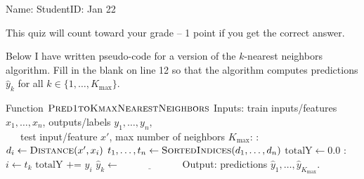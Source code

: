 \documentclass{article}[12pt]
\begin{document}
\thispagestyle{empty}


Name: \underline{\hspace{2in}} StudentID: \underline{\hspace{2in}} Jan 22

This quiz will count toward your grade -- 1 point if you get the
correct answer.

Below I have written pseudo-code for a version of the $k$-nearest
neighbors algorithm. Fill in the blank on line 12 so that the
algorithm computes predictions $\hat y_k$ for all
$k\in\{1,\dots, K_{\text{max}}\}$.

\begin{algorithmic}[1]
  \State Function $\textsc{Pred1toKmaxNearestNeighbors}$
  \State Inputs: train inputs/features $x_1,\dots,x_n$, outputs/labels $y_1,\dots,y_n$,\\ \ \ \ test input/feature $x'$, max number of neighbors $K_{\text{max}}$:
  :
  \State $d_i\gets \textsc{Distance}(x', x_i)$
  \EndFor
  \State $t_1,\dots,t_n\gets \textsc{SortedIndices}(d_1,\dots,d_n)$
  \State $\text{totalY}\gets 0.0$
  :
  \State $i\gets t_k$
  \State $\text{totalY} \texttt{ += } y_i$
  \State $\hat y_k\gets \underline{\hspace{1in}}$
  \EndFor
  \State Output: predictions $\hat y_1, \dots, \hat y_{K_\text{max}}$.
\end{algorithmic}
\end{document}

